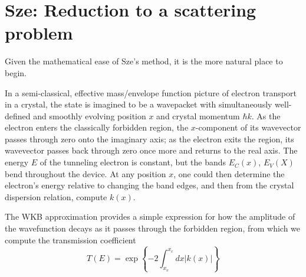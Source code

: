 \section{Sze: Reduction to a scattering problem}
Given the mathematical ease of Sze's method, it is the more natural place to begin.

In a semi-classical, effective mass/envelope function picture of electron transport in a crystal, the state is imagined to be a wavepacket with simultaneously well-defined and smoothly evolving position $x$ and crystal momentum $\hbar k$.  As the electron enters the classically forbidden region, the $x$-component of its wavevector passes through zero onto the imaginary axis; as the electron exits the region, its wavevector passes back through zero once more and returns to the real axis.  The energy $E$ of the tunneling electron is constant, but the bands $E_C(x)$, $E_V(X)$ bend throughout the device.  At any position $x$, one could then determine the electron's energy relative to changing the band edges, and then from the crystal dispersion relation, compute $k(x)$.

The WKB approximation provides a simple expression for how the amplitude of the wavefunction decays as it passes through the forbidden region, from which we compute the transmission coefficient
$$T(E)=\exp\left\{-2\int_{x_v}^{x_c}dx|k(x)|\right\}$$